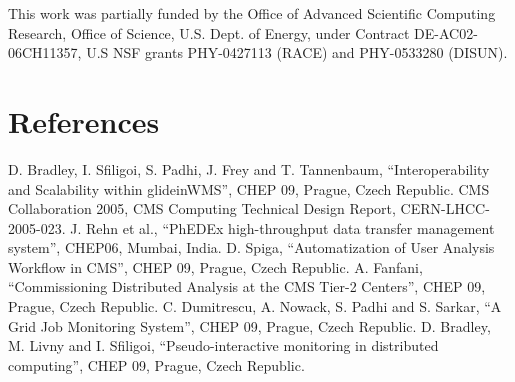 \documentclass[a4paper]{jpconf}
\begin{document}
\ack
This work was partially funded by the Office of Advanced Scientific Computing
Research, Office of Science, U.S. Dept. of Energy, under Contract
DE-AC02-06CH11357, U.S NSF grants PHY-0427113 (RACE) and PHY-0533280 (DISUN).
\section*{References}
\begin{thebibliography}{15}

D. Bradley, I. Sfiligoi, S. Padhi, J. Frey and T. Tannenbaum, ``Interoperability and Scalability within glideinWMS'', CHEP 09, Prague, Czech Republic.
CMS Collaboration 2005, CMS Computing Technical Design Report, CERN-LHCC-2005-023.
J. Rehn et al., ``PhEDEx high-throughput data transfer management system'', CHEP06, Mumbai, India.
D. Spiga, ``Automatization of User Analysis Workflow in CMS'', CHEP 09, Prague, Czech Republic.
A. Fanfani, ``Commissioning Distributed Analysis at the CMS Tier-2 Centers'', CHEP 09, Prague, Czech Republic.
C. Dumitrescu, A. Nowack, S. Padhi and S. Sarkar, ``A Grid Job Monitoring System'', CHEP 09, Prague, Czech Republic.
D. Bradley, M. Livny and I. Sfiligoi, ``Pseudo-interactive monitoring in distributed computing'', CHEP 09, Prague, Czech Republic.
\end{thebibliography}
\end{document}
